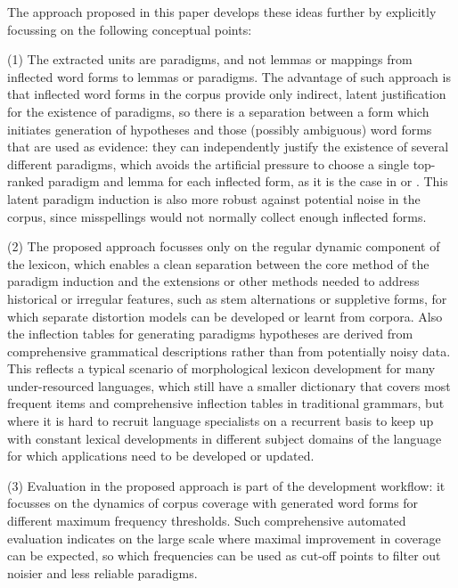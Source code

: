 \documentclass[11pt,a4paper]{article}
\begin{document}
The approach proposed in this paper develops these ideas further by explicitly focussing on the following conceptual points:

(1) The extracted units are paradigms, and not lemmas or mappings from inflected word forms to lemmas or paradigms. The advantage of such approach is that inflected word forms in the corpus provide only indirect, latent justification for the existence of paradigms, so there is a separation between a form which initiates generation of hypotheses and those (possibly ambiguous) word forms that are used as evidence: they can independently justify the existence of several different paradigms, which avoids the artificial pressure to choose a single top-ranked paradigm and lemma for each inflected form, as it is the case in \cite{oliver2004enlarging} or \cite{hulden2014semi}. This latent paradigm induction is also more robust against potential noise in the corpus, since misspellings would not normally collect enough inflected forms.

(2) The proposed approach focusses only on the regular dynamic component of the lexicon, which enables a clean separation between the core method of the paradigm induction and the extensions or other methods needed to address historical or irregular features, such as stem alternations or suppletive forms, for which separate distortion models can be developed or learnt from corpora. Also the inflection tables for generating paradigms hypotheses are derived from comprehensive grammatical descriptions rather than from potentially noisy data. This reflects a typical scenario of morphological lexicon development for many under-resourced languages, which still have a smaller dictionary that covers most frequent items and comprehensive inflection tables in traditional grammars, but where it is hard to recruit language specialists on a recurrent basis to keep up with constant lexical developments in different subject domains of the language for which applications need to be developed or updated.

(3) Evaluation in the proposed approach is part of the development workflow: it focusses on the dynamics of corpus coverage with generated word forms for different maximum frequency thresholds. Such comprehensive automated evaluation indicates on the large scale where maximal improvement in coverage can be expected, so which frequencies can be used as cut-off points to filter out noisier and less reliable paradigms.
\end{document}
